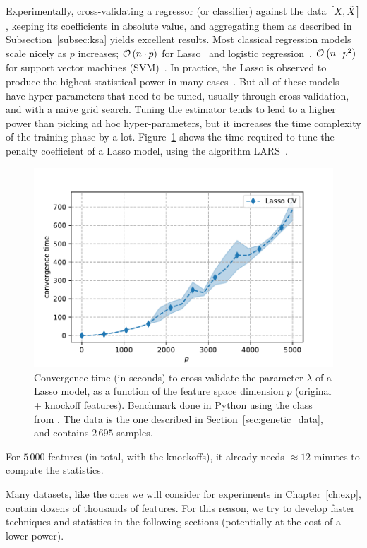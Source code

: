 Experimentally, cross-validating a regressor (or classifier) against the data $\big[ X, \tilde{X} \big]$,
keeping its coefficients in absolute value,
and aggregating them as described in Subsection~\ref{subsec:ksa} yields excellent results.
Most classical regression models scale nicely as $p$ increases;
$\mathcal{O}\left( n \cdot p \right)$ for Lasso~\citep{lasso} and logistic regression~\citep{logistic_regression},
$\mathcal{O}\left( n \cdot p^2 \right)$ for support vector machines (SVM)~\citep{svm}.
In practice, the Lasso is observed to produce the highest statistical power in many cases~\citep{model_x_knockoffs}.
But all of these models have hyper-parameters that need to be tuned,
usually through cross-validation,
and with a naive grid search.
Tuning the estimator tends to lead to a higher power than picking ad hoc hyper-parameters,
but it increases the time complexity of the training phase by a lot.
Figure~\ref{fig:lasso_times} shows the time required to tune the penalty coefficient of a Lasso model,
using the algorithm LARS~\citep{lars}.
\begin{figure}
    \centering
    \includegraphics[width=0.8\linewidth, height=0.5\linewidth]{figures/lasso_cv_times.pdf}
    \caption{
        Convergence time (in seconds) to cross-validate the parameter $\lambda$ of a Lasso model,
        as a function of the feature space dimension $p$ (original + knockoff features).
        Benchmark done in Python using the class  from .
        The data is the one described in Section~\ref{sec:genetic_data},
        and contains $2\,695$ samples.
    }
    \label{fig:lasso_times}
\end{figure}
For $5\,000$ features (in total, with the knockoffs),
it already needs $\approx 12$ minutes to compute the statistics.

Many datasets, like the ones we will consider for experiments in Chapter~\ref{ch:exp},
contain dozens of thousands of features.
For this reason, we try to develop faster techniques and statistics in the following sections
(potentially at the cost of a lower power).

